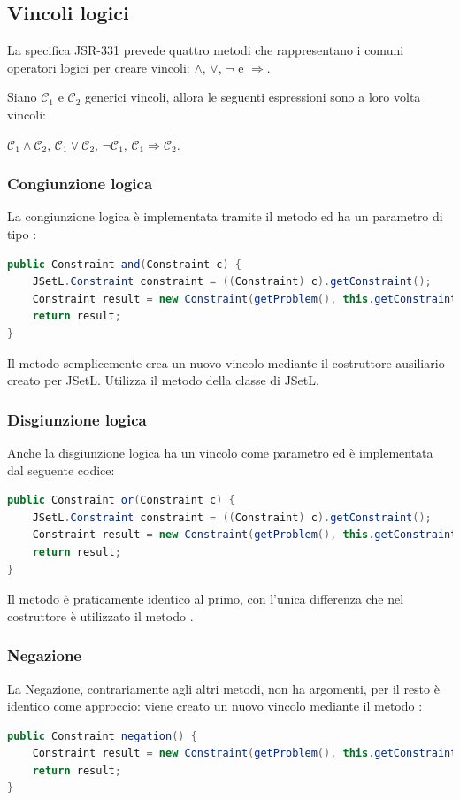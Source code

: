 \subsection{Vincoli logici}
La specifica JSR-331 prevede quattro metodi che rappresentano i comuni
operatori logici per creare vincoli: $\wedge$, $\vee$, $\neg$ e $\Rightarrow$.

Siano $\mathcal{C}_1$ e $\mathcal{C}_2$ generici vincoli, allora le seguenti
espressioni sono a loro volta vincoli:
\begin{center}
$\mathcal{C}_1 \wedge \mathcal{C}_2$,\quad
$\mathcal{C}_1 \vee \mathcal{C}_2$, \quad
$\neg \mathcal{C}_1$, \quad
$\mathcal{C}_1 \Rightarrow \mathcal{C}_2$.
\end{center}

\subsubsection{Congiunzione logica}
La congiunzione logica è implementata tramite il metodo  ed ha un
parametro di tipo :
\begin{lstlisting}[language = Java,
                   caption = {\files{and}.}]
public Constraint and(Constraint c) {
	JSetL.Constraint constraint = ((Constraint) c).getConstraint();
	Constraint result = new Constraint(getProblem(), this.getConstraint().and(constraint));
	return result;
}
\end{lstlisting}
Il metodo semplicemente crea un nuovo vincolo mediante il costruttore ausiliario
creato per JSetL. Utilizza il metodo  della classe
 di JSetL.

\subsubsection{Disgiunzione logica}
Anche la disgiunzione logica ha un vincolo come parametro ed è implementata 
dal seguente codice: 
\begin{lstlisting}[language = Java,
                   caption = {\files{or}.}]
public Constraint or(Constraint c) {
	JSetL.Constraint constraint = ((Constraint) c).getConstraint();
	Constraint result = new Constraint(getProblem(), this.getConstraint().or(constraint));
	return result;		
}
\end{lstlisting}
Il metodo è praticamente identico al primo, con l'unica differenza che nel
costruttore è utilizzato il metodo . 

\subsubsection{Negazione}
La Negazione, contrariamente agli altri metodi, non ha argomenti, per il 
resto è identico come approccio: viene creato un nuovo vincolo
mediante il metodo :
\begin{lstlisting}[language = Java,
                   caption = {\files{negation}.}]
public Constraint negation() {
	Constraint result = new Constraint(getProblem(), this.getConstraint().notTest());
	return result;		
}
\end{lstlisting}

